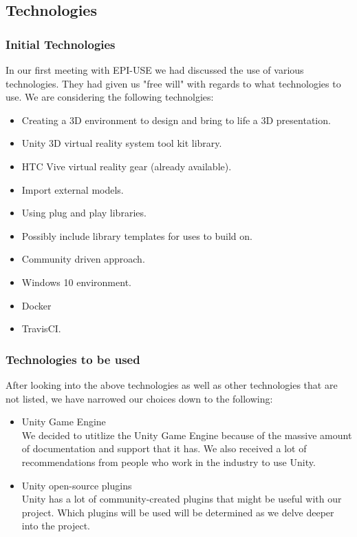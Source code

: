 \begin{flushleft}
\newpage
\subsection{Technologies}
	\subsubsection{Initial Technologies}
		In our first meeting with EPI-USE we had discussed the use of various technologies. They had given us "free will" with regards to what technologies to use. We are considering the following technolgies:
		\begin{itemize}
			\item Creating a 3D environment to design and bring to life a 3D presentation.
			\item Unity 3D virtual reality system tool kit library.
			\item HTC Vive virtual reality gear (already available).
			\item Import external models.
			\item Using plug and play libraries.
			\item Possibly include library templates for uses to build on.
			\item Community driven approach.
			\item Windows 10 environment.
			\item Docker
			\item TravisCI.
		\end{itemize}

	\subsubsection{Technologies to be used}
		After looking into the above technologies as well as other technologies that are not listed, we have narrowed our choices down to the following:
		\begin{itemize}
			\item Unity Game Engine \\
			We decided to utitlize the Unity Game Engine because of the massive amount of documentation and support that it has. We also received a lot of recommendations from people who work in the industry to use Unity.\\

			\item Unity open-source plugins \\
			Unity has a lot of community-created plugins that might be useful with our project. Which plugins will be used will be determined as we delve deeper into the project. \\


\end{itemize}
\end{flushleft}
